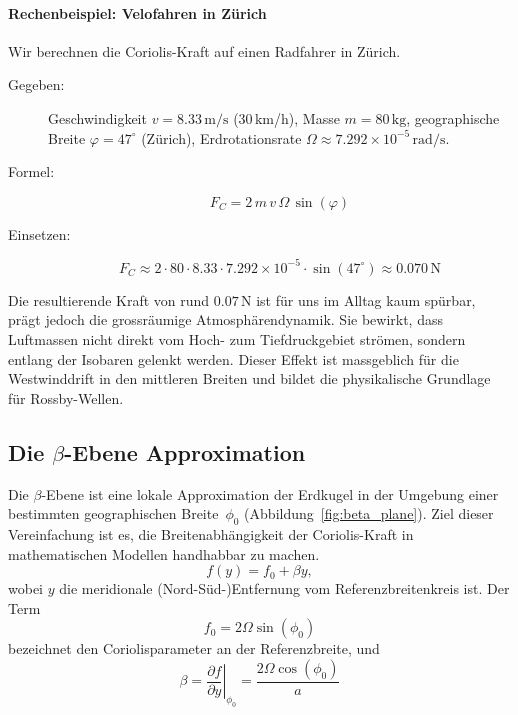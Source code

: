 \paragraph{Rechenbeispiel: Velofahren in Zürich}

Wir berechnen die Coriolis-Kraft auf einen Radfahrer in Zürich.

\begin{description}
	\item[Gegeben:] Geschwindigkeit \(v = 8.33\,\mathrm{m/s}\) (30\,km/h), Masse \(m =
	      80\,\mathrm{kg}\), geographische Breite \(\varphi = 47^\circ\) (Zürich),
	      Erdrotationsrate \(\Omega \approx 7.292 \times 10^{-5}\,\mathrm{rad/s}\).
	\item[Formel:]
	      \[
		      F_C = 2\,m\,v\,\Omega\,\sin(\varphi)
	      \]
	\item[Einsetzen:]
	      \[
		      F_C \approx 2 \cdot 80 \cdot 8.33 \cdot 7.292 \times 10^{-5} \cdot \sin(47^\circ)
		      \approx 0.070\,\mathrm{N}
	      \]
\end{description}

\noindent
Die resultierende Kraft von rund \(0.07\,\mathrm{N}\) ist für uns im Alltag kaum spürbar, prägt jedoch die grossräumige Atmosphärendynamik.
Sie bewirkt, dass Luftmassen nicht direkt vom Hoch- zum Tiefdruckgebiet strömen, sondern entlang der Isobaren gelenkt werden.
Dieser Effekt ist massgeblich für die Westwinddrift in den mittleren Breiten und bildet die physikalische Grundlage für Rossby-Wellen.

\subsection{Die \texorpdfstring{$\beta$}{β}-Ebene Approximation}

Die $\beta$-Ebene ist eine lokale Approximation der Erdkugel in der Umgebung
einer bestimmten geographischen Breite~$\phi_0$
(Abbildung~\ref{fig:beta_plane}). Ziel dieser Vereinfachung ist es, die
Breitenabhängigkeit der Coriolis-Kraft in mathematischen Modellen handhabbar zu
machen.
\begin{equation}
	f(y) = f_0 + \beta y,
	\label{rossby:eq:beta_plane}
\end{equation}
wobei $y$ die meridionale (Nord-Süd-)Entfernung vom Referenzbreitenkreis ist. Der Term
\begin{equation}
	f_0 = 2\Omega \sin(\phi_0)
	\label{rossby:eq:coriolis_parameter_ref}
\end{equation}
bezeichnet den Coriolisparameter an der Referenzbreite, und
\begin{equation}
	\beta = \left.\frac{\partial f}{\partial y}\right|_{\phi_0} = \frac{2\Omega \cos(\phi_0)}{a}
	\label{rossby:eq:beta_parameter_ref}
\end{equation}

